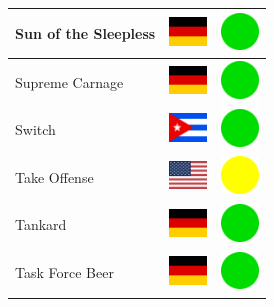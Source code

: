 \documentclass[12pt, a4paper, twoside]{report}
\begin{document}
\begin{center}
\begin{longtable}{|p{5cm}|p{2cm}|p{2cm}|}
 Sun of the Sleepless                                       & \includegraphics[width=1cm]{4x3/de} &   \includegraphics[width=1cm]{likes/y} \\ \hline
 Supreme Carnage                                            & \includegraphics[width=1cm]{4x3/de} &   \includegraphics[width=1cm]{likes/y} \\ \hline
 Switch                                                     & \includegraphics[width=1cm]{4x3/cu} &   \includegraphics[width=1cm]{likes/y} \\ \hline
 Take Offense                                               & \includegraphics[width=1cm]{4x3/us} &   \includegraphics[width=1cm]{likes/m} \\ \hline
 Tankard                                                    & \includegraphics[width=1cm]{4x3/de} &   \includegraphics[width=1cm]{likes/y} \\ \hline
 Task Force Beer                                            & \includegraphics[width=1cm]{4x3/de} &   \includegraphics[width=1cm]{likes/y} \\ \hline

\end{longtable}
\end{center}
\end{document}
